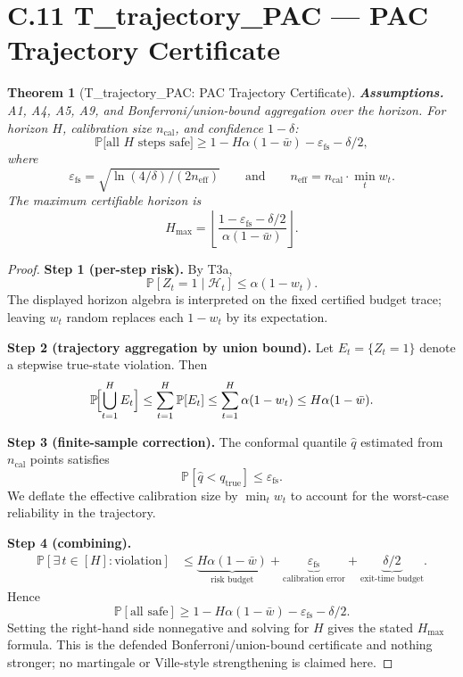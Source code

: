 \documentclass[11pt]{article}
\newtheorem{theorem}{Theorem}
\newcommand{\1}{\mathbf{1}}
\newcommand{\Prob}{\mathbb{P}}
\begin{document}
\section*{C.11 T\_trajectory\_PAC --- PAC Trajectory Certificate}

\begin{theorem}[T\_trajectory\_PAC: PAC Trajectory Certificate]\label{thm:t_trajectory_pac}
\textbf{Assumptions.} A1, A4, A5, A9, and Bonferroni/union-bound aggregation
over the horizon. For horizon $H$, calibration size $n_{\mathrm{cal}}$, and
confidence $1-\delta$:
\[
  \Prob\!\bigl[\text{all }H\text{ steps safe}\bigr]
  \ge
  1-H\alpha(1-\bar w)-\varepsilon_{\mathrm{fs}}-\delta/2,
\]
where
\[
  \varepsilon_{\mathrm{fs}}
  =
  \sqrt{\ln(4/\delta)/(2n_{\mathrm{eff}})}
  \qquad\text{and}\qquad
  n_{\mathrm{eff}} = n_{\mathrm{cal}}\cdot\min_t w_t.
\]
The maximum certifiable horizon is
\[
  H_{\max}
  =
  \left\lfloor
    \frac{1-\varepsilon_{\mathrm{fs}}-\delta/2}{\alpha(1-\bar w)}
  \right\rfloor.
\]
\end{theorem}

\begin{proof}
\textbf{Step 1 (per-step risk).}
By T3a,
\[
  \Prob[Z_t=1\mid\mathcal{H}_t]\le\alpha(1-w_t).
\]
The displayed horizon algebra is interpreted on the fixed certified budget
trace; leaving \(w_t\) random replaces each \(1-w_t\) by its expectation.

\textbf{Step 2 (trajectory aggregation by union bound).}
Let $E_t=\{Z_t=1\}$ denote a stepwise true-state violation. Then
\[
  \Prob\!\Bigl[\bigcup_{t=1}^{H} E_t\Bigr]
  \le \sum_{t=1}^{H}\Prob[E_t]
  \le \sum_{t=1}^{H}\alpha(1-w_t)
  \le H\alpha(1-\bar w).
\]

\textbf{Step 3 (finite-sample correction).}
The conformal quantile $\hat q$ estimated from $n_{\mathrm{cal}}$ points
satisfies
\[
  \Prob[\hat q<q_{\mathrm{true}}]\le\varepsilon_{\mathrm{fs}}.
\]
We deflate the effective calibration size by $\min_t w_t$ to account for the
worst-case reliability in the trajectory.

\textbf{Step 4 (combining).}
\begin{align*}
  \Prob[\exists\,t\in[H]:\text{violation}]
  &\le
  \underbrace{H\alpha(1-\bar w)}_{\text{risk budget}}
  +
  \underbrace{\varepsilon_{\mathrm{fs}}}_{\text{calibration error}}
  +
  \underbrace{\delta/2}_{\text{exit-time budget}}.
\end{align*}
Hence
\[
  \Prob[\text{all safe}]
  \ge
  1-H\alpha(1-\bar w)-\varepsilon_{\mathrm{fs}}-\delta/2.
\]
Setting the right-hand side nonnegative and solving for $H$ gives the stated
$H_{\max}$ formula. This is the defended Bonferroni/union-bound certificate and
nothing stronger; no martingale or Ville-style strengthening is claimed here.
\qedhere
\end{proof}
\end{document}
